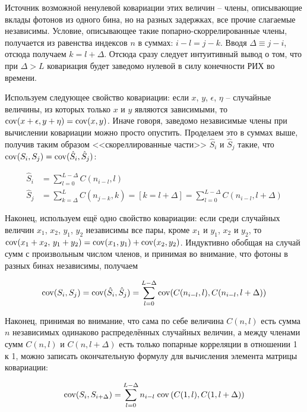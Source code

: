 Источник возможной ненулевой ковариации этих величин -- члены, описывающие вклады фотонов из одного бина, но на разных задержках, все прочие слагаемые независимы. Условие, описывающее такие попарно-скоррелированные члены, получается из равенства индексов $n$ в суммах: $i-l = j-k$. Вводя $\Delta \equiv j - i$, отсюда получаем $k = l + \Delta$. Отсюда сразу следует интуитивный вывод о том, что при $\Delta > L$ ковариация будет заведомо нулевой в силу конечности РИХ во времени.

Используем следующее свойство ковариации: если $x$, $y$, $\epsilon$, $\eta$ -- случайные величины, из которых только $x$ и $y$ являются зависимыми, то $\mathrm{cov}(x + \epsilon, y + \eta) = \mathrm{cov}(x, y)$. Иначе говоря, заведомо независимые члены при вычислении ковариации можно просто опустить. Проделаем это в суммах выше, получив таким образом <<скореллированные части>> $\hat{S}_i$ и $\hat{S}_j$ такие, что $\mathrm{cov} ( S_i, S_j  ) = \mathrm{cov} ( \hat{S}_i, \hat{S}_j )$:

\begin{align}
	\hat{S}_i &= \sum_{l=0}^{L-\Delta} C(n_{i-l}, l)\\
	\hat{S}_j &= \sum_{k=\Delta}^{L} C(n_{j-k}, k) = \left[k=l+\Delta\right] = \sum_{l=0}^{L-\Delta} C(n_{i-l}, l+\Delta)
\end{align}

Наконец, используем ещё одно свойство ковариации: если среди случайных величин $x_1$, $x_2$, $y_1$, $y_2$ независимы все пары, кроме $x_1$ и $y_1$, $x_2$ и $y_2$, то $\mathrm{cov}(x_1 + x_2, \, y_1 + y_2) = \mathrm{cov}(x_1, y_1) + \mathrm{cov}(x_2, y_2)$. Индуктивно обобщая на случай сумм с произвольным числом членов, и принимая во внимание, что фотоны в разных бинах независимы, получаем

\begin{equation}
	\mathrm{cov}(S_i, S_j) = \mathrm{cov}(\hat{S}_i, \hat{S}_j) = \sum_{l=0}^{L - \Delta} \mathrm{cov}(C(n_{i-l}, l), C(n_{i-l}, l + \Delta))
\end{equation}

Наконец, принимая во внимание, что сама по себе величина $C(n, l)$ есть сумма $n$ независимых одинаково распределённых случайных величин, а между членами сумм $C(n, l)$ и $C(n, l + \Delta)$ есть только попарные корреляции в отношении 1 к 1, можно записать окончательную формулу для вычисления элемента матрицы ковариации:

\begin{equation}
	\mathrm{cov}(S_i, S_{i + \Delta}) = \sum_{l=0}^{L - \Delta} n_{i-l} \; \mathrm{cov}\left(C(1, l), C(1, l + \Delta)\right)
\end{equation}


